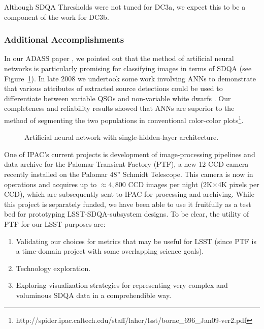 Although SDQA Thresholds were not tuned for DC3a, we expect this to be a component of the
work for DC3b.


\subsubsection{Additional Accomplishments}

In our ADASS paper \citet{laher08}, we pointed out that the method of 
artificial neural networks is particularly promising for classifying images in 
terms of SDQA (see Figure~\ref{ANN}).  In late 2008 we undertook some work 
involving ANNs to demonstrate that various attributes of extracted source detections 
could be used to differentiate between variable QSOs and non-variable white dwarfs 
\citet{borne09}.  Our completeness and reliability results showed that ANNs 
are superior to the method of segmenting the two populations in conventional 
color-color plots\footnote{
http://spider.ipac.caltech.edu/staff/laher/lsst/borne\_696\_Jan09-ver2.pdf
}.

\begin{figure}
\caption{Artificial neural network with single-hidden-layer architecture.} 
 \label{ANN}
\end{figure}


One of IPAC's current projects is development of image-processing pipelines and data archive
for the Palomar Transient Factory (PTF), a new 12-CCD camera recently installed on the Palomar
48'' Schmidt Telescope.  This camera is now in operations and acquires up to $\approx 4,800$
CCD images per night (2K$\times$4K pixels per CCD), 
which are subsequently sent to IPAC for processing and archiving.  
While this project is separately funded, we have been able to use
it fruitfully as a test bed for prototyping LSST-SDQA-subsystem designs.  
To be clear, the utility of PTF for our LSST purposes are:

\begin{enumerate} 
\item{Validating our choices for metrics that may be useful for LSST (since PTF is a 
time-domain project with some overlapping science goals).}
\item{Technology exploration.}
\item{Exploring visualization strategies for representing very complex and 
voluminous SDQA data in a comprehendible way.}
\end{enumerate} 

